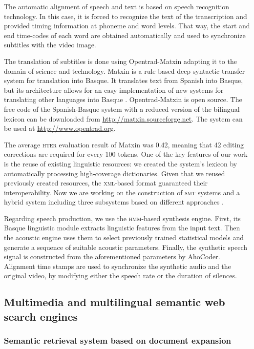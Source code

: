 \documentclass[output=paper]{LSP/langsci}
\begin{document}
The automatic alignment of speech and text is based on speech recognition technology. In this case, it is forced to recognize the text of the transcription and provided timing information at phoneme and word levels. That way, the start and end time-codes of each word are obtained automatically and used to synchronize subtitles with the video image.  

The translation of subtitles is done using Opentrad-Matxin \citep{MayorEtAl2011} adapting it to the domain of science and technology. Matxin is a rule-based deep syntactic transfer system for translation into Basque. It translates text from Spanish into Basque, but its architecture allows for an easy implementation of new systems for translating other languages into Basque \citep{Mayor2009}. Opentrad-Matxin is open source. The free code of the Spanish-Basque system with a reduced version of the bilingual lexicon can be downloaded from \url{http://matxin.sourceforge.net}. The system can be used at \url{http://www.opentrad.org}.

The average \textsc{hter} evaluation result of Matxin was 0.42, meaning that 42 editing corrections are required for every 100 tokens. One of the key features of our work is the reuse of existing linguistic resources: we created the system's lexicon by automatically processing high-coverage dictionaries. Given that we reused previously created resources, the \textsc{xml}-based format guaranteed their interoperability. Now we are working on the construction of \textsc{smt} systems and a hybrid system including three subsystems based on different approaches \citep{España-BonetEtAl2011}.

Regarding speech production, we use the \textsc{hmm}-based synthesis  engine. First, its Basque linguistic module extracts linguistic features from the input text. Then the acoustic engine uses them to select previously trained statistical models and generate a sequence of suitable acoustic parameters. 
Finally, the synthetic speech signal is constructed from the aforementioned parameters by AhoCoder. Alignment time stamps are used to synchronize the synthetic audio and the original video, by modifying either the speech rate or the duration of silences.


\subsection{Multimedia and multilingual semantic web search engines}\label{sec:leturia:5.2}
\subsubsection{Semantic retrieval system based on document expansion}\label{sec:leturia:5.2.1}
\end{document}
